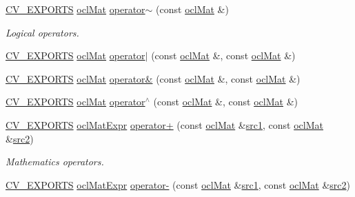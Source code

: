 \begin{DoxyCompactItemize}
\item 
\hyperlink{core_2types__c_8h_a1bf9f0e121b54272da02379cfccd0a2b}{C\-V\-\_\-\-E\-X\-P\-O\-R\-T\-S} \hyperlink{classcv_1_1ocl_1_1oclMat}{ocl\-Mat} \hyperlink{namespacecv_1_1ocl_a64e69bbcf64fd849a37aab7f9152b0b8}{operator$\sim$} (const \hyperlink{classcv_1_1ocl_1_1oclMat}{ocl\-Mat} \&)
\begin{DoxyCompactList}\small\item\em Logical operators. \end{DoxyCompactList}\item 
\hyperlink{core_2types__c_8h_a1bf9f0e121b54272da02379cfccd0a2b}{C\-V\-\_\-\-E\-X\-P\-O\-R\-T\-S} \hyperlink{classcv_1_1ocl_1_1oclMat}{ocl\-Mat} \hyperlink{namespacecv_1_1ocl_a01078a3a68c5fd5cc88c4af492c56502}{operator$\vert$} (const \hyperlink{classcv_1_1ocl_1_1oclMat}{ocl\-Mat} \&, const \hyperlink{classcv_1_1ocl_1_1oclMat}{ocl\-Mat} \&)
\item 
\hyperlink{core_2types__c_8h_a1bf9f0e121b54272da02379cfccd0a2b}{C\-V\-\_\-\-E\-X\-P\-O\-R\-T\-S} \hyperlink{classcv_1_1ocl_1_1oclMat}{ocl\-Mat} \hyperlink{namespacecv_1_1ocl_ab74f187f01fdee3bb700cb3c98de5d02}{operator\&} (const \hyperlink{classcv_1_1ocl_1_1oclMat}{ocl\-Mat} \&, const \hyperlink{classcv_1_1ocl_1_1oclMat}{ocl\-Mat} \&)
\item 
\hyperlink{core_2types__c_8h_a1bf9f0e121b54272da02379cfccd0a2b}{C\-V\-\_\-\-E\-X\-P\-O\-R\-T\-S} \hyperlink{classcv_1_1ocl_1_1oclMat}{ocl\-Mat} \hyperlink{namespacecv_1_1ocl_aabb88d4a2bda0304858e6562a2a437b0}{operator$^\wedge$} (const \hyperlink{classcv_1_1ocl_1_1oclMat}{ocl\-Mat} \&, const \hyperlink{classcv_1_1ocl_1_1oclMat}{ocl\-Mat} \&)
\item 
\hyperlink{core_2types__c_8h_a1bf9f0e121b54272da02379cfccd0a2b}{C\-V\-\_\-\-E\-X\-P\-O\-R\-T\-S} \hyperlink{classcv_1_1ocl_1_1oclMatExpr}{ocl\-Mat\-Expr} \hyperlink{namespacecv_1_1ocl_ab4cb207bbc2c2221a8a254ca0c166698}{operator+} (const \hyperlink{classcv_1_1ocl_1_1oclMat}{ocl\-Mat} \&\hyperlink{core__c_8h_a897de4702c922f4cccda0d57ccdcafb3}{src1}, const \hyperlink{classcv_1_1ocl_1_1oclMat}{ocl\-Mat} \&\hyperlink{core__c_8h_a7561a36d48069d54a6c8ac4e4750edfd}{src2})
\begin{DoxyCompactList}\small\item\em Mathematics operators. \end{DoxyCompactList}\item 
\hyperlink{core_2types__c_8h_a1bf9f0e121b54272da02379cfccd0a2b}{C\-V\-\_\-\-E\-X\-P\-O\-R\-T\-S} \hyperlink{classcv_1_1ocl_1_1oclMatExpr}{ocl\-Mat\-Expr} \hyperlink{namespacecv_1_1ocl_a4f617e55c0660e64083568c9d26689fb}{operator-\/} (const \hyperlink{classcv_1_1ocl_1_1oclMat}{ocl\-Mat} \&\hyperlink{core__c_8h_a897de4702c922f4cccda0d57ccdcafb3}{src1}, const \hyperlink{classcv_1_1ocl_1_1oclMat}{ocl\-Mat} \&\hyperlink{core__c_8h_a7561a36d48069d54a6c8ac4e4750edfd}{src2})

\end{DoxyCompactItemize}
